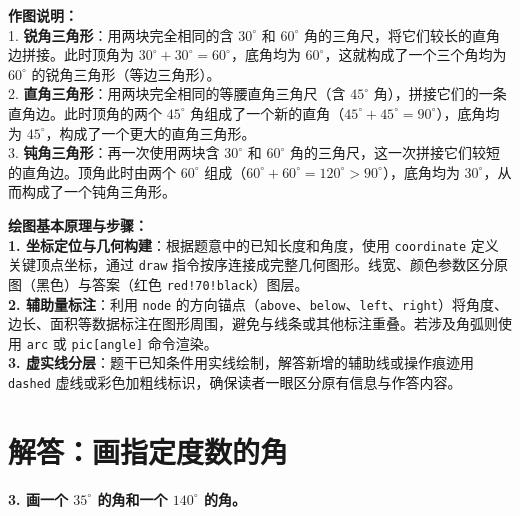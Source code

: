\vspace{0.6cm}
{\small\color{gray}
\textbf{作图说明：}\\
1. \textbf{锐角三角形}：用两块完全相同的含 $30^\circ$ 和 $60^\circ$ 角的三角尺，将它们较长的直角边拼接。此时顶角为 $30^\circ + 30^\circ = 60^\circ$，底角均为 $60^\circ$，这就构成了一个三个角均为 $60^\circ$ 的锐角三角形（等边三角形）。\\
2. \textbf{直角三角形}：用两块完全相同的等腰直角三角尺（含 $45^\circ$ 角），拼接它们的一条直角边。此时顶角的两个 $45^\circ$ 角组成了一个新的直角（$45^\circ + 45^\circ = 90^\circ$），底角均为 $45^\circ$，构成了一个更大的直角三角形。\\
3. \textbf{钝角三角形}：再一次使用两块含 $30^\circ$ 和 $60^\circ$ 角的三角尺，这一次拼接它们较短的直角边。顶角此时由两个 $60^\circ$ 组成（$60^\circ + 60^\circ = 120^\circ>90^\circ$），底角均为 $30^\circ$，从而构成了一个钝角三角形。
}

\vspace{0.8cm}


\vspace{0.6cm}

{\small\color{blue!70!black}
\textbf{绘图基本原理与步骤：}\\
\textbf{1. 坐标定位与几何构建}：根据题意中的已知长度和角度，使用 \texttt{coordinate} 定义关键顶点坐标，通过 \texttt{draw} 指令按序连接成完整几何图形。线宽、颜色参数区分原图（黑色）与答案（红色 \texttt{red!70!black}）图层。\\
\textbf{2. 辅助量标注}：利用 \texttt{node} 的方向锚点（\texttt{above}、\texttt{below}、\texttt{left}、\texttt{right}）将角度、边长、面积等数据标注在图形周围，避免与线条或其他标注重叠。若涉及角弧则使用 \texttt{arc} 或 \texttt{pic[angle]} 命令渲染。\\
\textbf{3. 虚实线分层}：题干已知条件用实线绘制，解答新增的辅助线或操作痕迹用 \texttt{dashed} 虚线或彩色加粗线标识，确保读者一眼区分原有信息与作答内容。
}

\newpage


\section{解答：画指定度数的角}

\vspace{0.4cm}

\noindent\textbf{3. 画一个 $35^\circ$ 的角和一个 $140^\circ$ 的角。}

\vspace{1.2cm}

